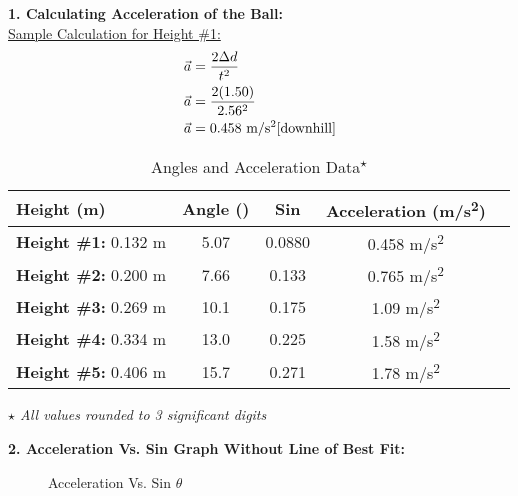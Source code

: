 \documentclass[12pt,letterpaper]{article}
\begin{document}
\textbf{1. Calculating Acceleration of the Ball:} \\
\underline{Sample Calculation for Height \#1:}\\
\[
	\begin{aligned}
		\vec{a} & =\frac{2\Delta d}{t^2}                         \\
		\vec{a} & =\frac{2(1.50)}{2.56^2}                        \\
		\vec{a} & =0.458~\text{m/s\textsuperscript{2}[downhill]}
	\end{aligned}
\]
\begin{table}[H]
	\caption{Angles and Acceleration Data\textsuperscript{$\star$}\label{table2}}
	\begin{tabular*}{\textwidth}{l@{\extracolsep{\fill}}cccc}
		\hline
		\textbf{\hspace{4mm} Height (m)} & \textbf{Angle (\textdegree)} & \textbf{Sin \bm{$\theta$}} & \textbf{Acceleration (m/s\textsuperscript{2})} \\
		\hline
		\textbf{Height \#1:} 0.132 m& 5.07\textdegree& 0.0880& 0.458 m/s\textsuperscript{2}\\
		\textbf{Height \#2:} 0.200 m& 7.66\textdegree& 0.133& 0.765 m/s\textsuperscript{2}\\
		\textbf{Height \#3:} 0.269 m& 10.1\textdegree& 0.175& 1.09 m/s\textsuperscript{2}\\
		\textbf{Height \#4:} 0.334 m& 13.0\textdegree& 0.225& 1.58 m/s\textsuperscript{2}\\
		\textbf{Height \#5:} 0.406 m& 15.7\textdegree& 0.271& 1.78 m/s\textsuperscript{2}\\
		\hline
	\end{tabular*}
\end{table}
\vspace{-8mm}
\hspace{-6mm}\textit{$\star$ All values rounded to 3 significant digits}
\newpage

\noindent
\textbf{2. Acceleration Vs. Sin \bm{$\theta$} Graph Without Line of Best Fit:}

\begin{figure}[H]
	\caption{Acceleration Vs. Sin $\theta$\label{figure1}}
	\vspace{-4mm}
\end{figure}
\end{document}
